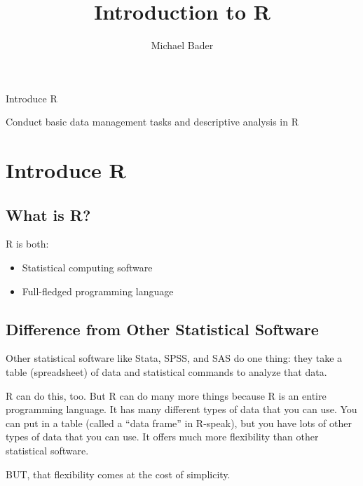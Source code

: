 \documentclass[11pt]{lecturenotes}
\title{Introduction to R}
\author{Michael Bader}
\begin{document}
\maketitle

\begin{objectives}{
\item Introduce R}{
\item Conduct basic data management tasks and descriptive analysis in R
}
\end{objectives}

\section{Introduce R}

\subsection[5]{What is R?}
R is both: 
\begin{itemize}
\item Statistical computing software
\item Full-fledged programming language
\end{itemize}

\subsection[10]{Difference from Other Statistical Software}
Other statistical software like Stata, SPSS, and SAS do one thing: they take a table (spreadsheet) of data and statistical commands to analyze that data. 

R can do this, too. But R can do many more things because R is an entire programming language. It has many different types of data that you can use. You can put in a table (called a ``data frame'' in R-speak), but you have lots of other types of data that you can use. It offers much more flexibility than other statistical software. 

BUT, that flexibility comes at the cost of simplicity. 
\end{document}
